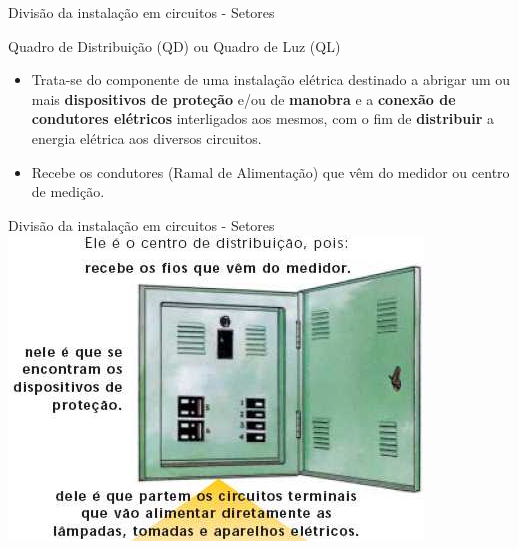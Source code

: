 \begin{frame}{Divisão da instalação em circuitos - Setores}
	\begin{block}{Quadro de Distribuição (QD) ou Quadro de Luz (QL)}
		\begin{itemize}
			\item Trata-se do componente de uma instalação elétrica destinado a abrigar um ou mais \textbf{dispositivos de proteção} e/ou de \textbf{manobra} e a \textbf{conexão de condutores elétricos} interligados aos mesmos, com o fim de \textbf{distribuir} a energia elétrica aos diversos circuitos.
			\item Recebe os condutores (Ramal de Alimentação) que vêm do medidor ou centro de medição.
		\end{itemize}
	\end{block}

\end{frame}


\begin{frame}{Divisão da instalação em circuitos - Setores}
	\centering
	\includegraphics[width=0.8\linewidth]{Figuras/Ch05/fig5}
\end{frame}



